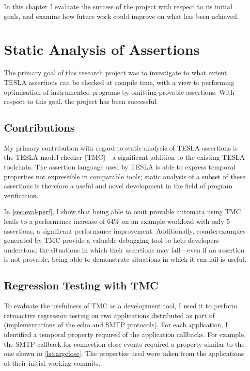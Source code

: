 In this chapter I evaluate the success of the project with respect to its
initial goals, and examine how future work could improve on what has been
achieved.

\section{Static Analysis of Assertions}

The primary goal of this research project was to investigate to what extent
TESLA assertions can be checked at compile time, with a view to performing
optimisation of instrumented programs by omitting provable assertions. With
respect to this goal, the project has been successful.

\subsection{Contributions}

My primary contribution with regard to static analysis of TESLA assertions is
the TESLA model checker (TMC)---a significant addition to the existing TESLA
toolchain. The assertion language used by TESLA is able to express temporal
properties not expressible in comparable tools; static analysis of a subset of
these assertions is therefore a useful and novel development in the field of
program verification.

In \autoref{sec:eval-perf}, I show that being able to omit provable
automata using TMC leads to a performance increase of 64\% on an example
workload with only 5 assertions, a significant performance improvement.
Additionally, counterexamples generated by TMC provide a valuable
debugging tool to help developers understand the situations in which
their assertions may fail---even if an assertion is not provable, being
able to demonstrate situations in which it can fail is useful.

\subsection{Regression Testing with TMC}

To evaluate the usefulness of TMC as a development tool, I used it to
perform retroactive regression testing on two applications distributed
as part of \lwip{} (implementations of the echo and SMTP protocols). For
each application, I identified a temporal property required of the
application callbacks. For example, the SMTP callback for connection
close events required a property similar to the one shown in
\autoref{lst:argclose}. The properties used were taken from the
applications at their initial working commits.


